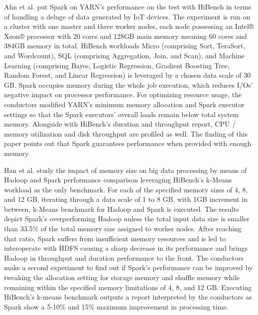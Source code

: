 \documentclass[review]{elsarticle}
\begin{document}
Ahn et al. \cite{ahn_performance_2018} put Spark on YARN's performance on the test with HiBench in terms of handling a deluge of data generated by IoT devices. The experiment is run on a cluster with one master and three worker nodes, each node possessing an Intel® Xeon® processor with 20 cores and 128GB main memory meaning 60 cores and 384GB memory in total. HiBench workloads Micro (comprising Sort, TeraSort, and Wordcount), SQL (comprising Aggregation, Join, and Scan), and Machine Learning (comprising Bayes, Logistic Regression, Gradient Boosting Tree, Random Forest, and Linear Regression) is leveraged by a chosen data scale of 30 GB. Spark occupies memory during the whole job execution, which reduces I/Os' negative impact on processor performance. For optimizing resource usage, the conductors modified YARN's minimum memory allocation and Spark executor settings so that the Spark executors' overall loads remain below total system memory. Alongside with HiBench's duration and throughput report, CPU / memory utilization and disk throughput are profiled as well. The finding of this paper points out that Spark guarantees performance when provided with enough memory.

Han et al. \cite{han_impact_2017} study the impact of memory size on big data processing by means of Hadoop and Spark performance comparison leveraging HiBench's k-Means workload as the only benchmark. For each of the specified memory sizes of 4, 8, and 12 GB, iterating through a data scale of 1 to 8 GB, with 1GB increment in between, k-Means benchmark for Hadoop and Spark is executed. The results depict Spark's overperforming Hadoop unless the total input data size is smaller than 33.5\% of the total memory size assigned to worker nodes. After reaching that ratio, Spark suffers from insufficient memory resources and is led to interoperate with HDFS causing a sharp decrease in its performance and brings Hadoop in throughput and duration performance to the front. The conductors make a second experiment to find out if Spark's performance can be improved by tweaking the allocation setting for storage memory and shuffle memory while remaining within the specified memory limitations of 4, 8, and 12 GB. Executing HiBench's k-means benchmark outputs a report interpreted by the conductors as Spark show a 5-10\% and 15\% maximum improvement in processing time.
\end{document}
